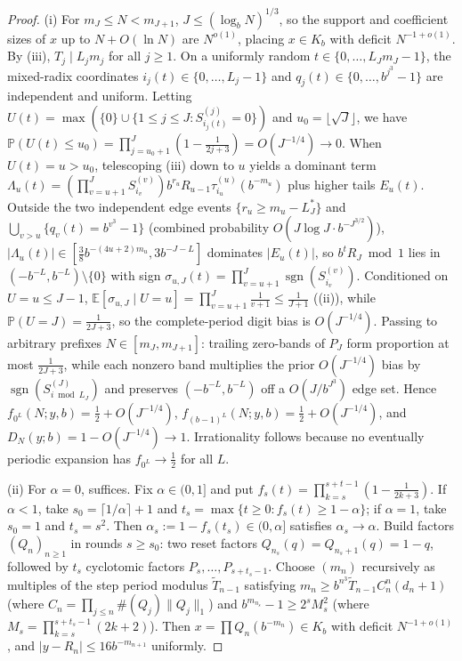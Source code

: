 \documentclass[11pt]{article}
\DeclareMathOperator{\sgn}{sgn}
\begin{document}
\begin{proof}
(i) For $m_J\le N<m_{J+1}$, $J\le(\log_b N)^{1/3}$, so the support and coefficient sizes of $x$ up to $N+O(\ln N)$ are $N^{o(1)}$, placing $x\in K_b$ with deficit $N^{-1+o(1)}$. By (iii), $T_j\mid L_jm_j$ for all $j\ge1$. On a uniformly random $t\in\{0,\dots,L_Jm_J-1\}$, the mixed-radix coordinates $i_j(t)\in\{0,\dots,L_j-1\}$ and $q_j(t)\in\{0,\dots,b^{j^3}-1\}$ are independent and uniform. Letting $U(t)=\max(\{0\}\cup\{1\le j\le J:S_{i_j(t)}^{(j)}=0\})$ and $u_0=\lfloor\sqrt J\rfloor$, we have $\mathbb P(U(t)\le u_0)=\prod_{j=u_0+1}^J(1-\frac1{2j+3})=O(J^{-1/4})\to0$. When $U(t)=u>u_0$, telescoping (iii) down to $u$ yields a dominant term $\Lambda_u(t)=(\prod_{v=u+1}^J S_{i_v}^{(v)})b^{r_u}R_{u-1}\tau_{i_u}^{(u)}(b^{-m_u})$ plus higher tails $E_u(t)$. Outside the two independent edge events $\{r_u\ge m_u-L_J^*\}$ and $\bigcup_{v>u}\{q_v(t)=b^{v^3}-1\}$ (combined probability $O(J\log J\cdot b^{-J^{3/2}})$), $|\Lambda_u(t)|\in[\frac38 b^{-(4u+2)m_u},3b^{-J-L}]$ dominates $|E_u(t)|$, so $b^tR_J\bmod1$ lies in $(-b^{-L},b^{-L})\setminus\{0\}$ with sign $\sigma_{u,J}(t)=\prod_{v=u+1}^J\sgn(S_{i_v}^{(v)})$. Conditioned on $U=u\le J-1$, $\mathbb E[\sigma_{u,J}\mid U=u]=\prod_{v=u+1}^J\frac1{v+1}\le\frac1{J+1}$ ((ii)), while $\mathbb P(U=J)=\frac1{2J+3}$, so the complete-period digit bias is $O(J^{-1/4})$. Passing to arbitrary prefixes $N\in[m_J,m_{J+1}]$: trailing zero-bands of $P_J$ form proportion at most $\frac1{2J+3}$, while each nonzero band multiplies the prior $O(J^{-1/4})$ bias by $\sgn(S_{i\bmod L_J}^{(J)})$ and preserves $(-b^{-L},b^{-L})$ off a $O(J/b^{J^3})$ edge set. Hence $f_{0^L}(N;y,b)=\frac12+O(J^{-1/4})$, $f_{(b-1)^L}(N;y,b)=\frac12+O(J^{-1/4})$, and $D_N(y;b)=1-O(J^{-1/4})\to1$. Irrationality follows because no eventually periodic expansion has $f_{0^L}\to\frac12$ for all $L$.

(ii) For $\alpha=0$,  suffices. Fix $\alpha\in(0,1]$ and put $f_s(t)=\prod_{k=s}^{s+t-1}(1-\frac1{2k+3})$. If $\alpha<1$, take $s_0=\lceil1/\alpha\rceil+1$ and $t_s=\max\{t\ge0:f_s(t)\ge 1-\alpha\}$; if $\alpha=1$, take $s_0=1$ and $t_s=s^2$. Then $\alpha_s:=1-f_s(t_s)\in(0,\alpha]$ satisfies $\alpha_s\to\alpha$. Build factors $(Q_n)_{n\ge1}$ in rounds $s\ge s_0$: two reset factors $Q_{n_s}(q)=Q_{n_s+1}(q)=1-q$, followed by $t_s$ cyclotomic factors $P_s,\dots,P_{s+t_s-1}$. Choose $(m_n)$ recursively as multiples of the step period modulus $\widetilde T_{n-1}$ satisfying $m_n\ge b^{n^3}\widetilde T_{n-1}C_n^n(d_n+1)$ (where $C_n=\prod_{j\le n}\#(Q_j)\|Q_j\|_1$) and $b^{m_{n_s}}-1\ge 2^s M_s^2$ (where $M_s=\prod_{k=s}^{s+t_s-1}(2k+2)$). Then $x=\prod Q_n(b^{-m_n})\in K_b$ with deficit $N^{-1+o(1)}$, and $|y-R_n|\le 16b^{-m_{n+1}}$ uniformly.


\end{proof}
\end{document}
